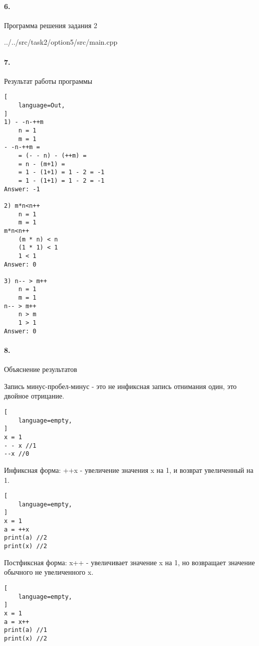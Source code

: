 \paragraph{6.} Программа решения задания 2


{../../src/task2/option5/src/main.cpp}

\newpage

\paragraph{7.} Результат работы программы

\begin{lstlisting}[
    language=Out,
]
1) - -n-++m
	n = 1
	m = 1
- -n-++m = 
	= (- - n) - (++m) = 
	= n - (m+1) = 
	= 1 - (1+1) = 1 - 2 = -1
	= 1 - (1+1) = 1 - 2 = -1
Answer: -1

2) m*n<n++
	n = 1
	m = 1
m*n<n++
	(m * n) < n
	(1 * 1) < 1
	1 < 1
Answer: 0

3) n-- > m++
	n = 1
	m = 1
n-- > m++
	n > m
	1 > 1
Answer: 0
\end{lstlisting}

\paragraph{8.} Объяснение результатов

Запись минус-пробел-минус - это не инфиксная запись отнимания один, это двойное отрицание.

\begin{lstlisting}[
    language=empty,
]
x = 1
- - x //1
--x //0
\end{lstlisting}

Инфиксная форма: ++x - увеличение значения x на 1, и возврат увеличенный на 1.

\begin{lstlisting}[
    language=empty,
]
x = 1
a = ++x
print(a) //2
print(x) //2
\end{lstlisting}

Постфиксная форма: x++ - увеличивает значение x на 1, но возвращает значение обычного не увеличенного x.

\begin{lstlisting}[
    language=empty,
]
x = 1
a = x++
print(a) //1
print(x) //2
\end{lstlisting}